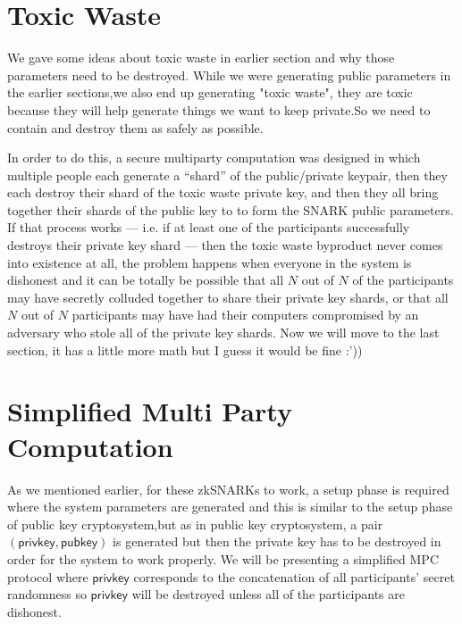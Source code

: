 \documentclass[12pt,letterpaper]{article}
\begin{document}
\section{Toxic Waste}
We gave some ideas about toxic waste in earlier section and why those parameters need to be destroyed. While we were generating public parameters in the earlier sections,we also end up generating "toxic waste", they are toxic because they will help generate things we want to keep private.So we need to contain and destroy them as safely as possible.

In order to do this, a secure multiparty computation was designed in which multiple people each generate a “shard” of the public/private keypair, then they each destroy their shard of the toxic waste private key, and then they all bring together their shards of the public key to to form the SNARK public parameters. If that process works — i.e. if at least one of the participants successfully destroys their private key shard — then the toxic waste byproduct never comes into existence at all, the problem happens when everyone in the system is dishonest and it can be totally be possible  that all $N$ out of $N$ of the participants may have secretly colluded together to share their private key shards, or that all $N$ out of $N$ participants may have had their computers compromised by an adversary who stole all of the private key shards. Now we will move to the last section, it has a little more math but I guess it would be fine :'))

\section{Simplified Multi Party Computation}
As we mentioned earlier, for these zkSNARKs to work, a setup phase is required where the system parameters are generated and this is similar to the setup phase of public key cryptosystem,but as in public key cryptosystem, a pair $(\mathsf{privkey},\mathsf{pubkey})$ is generated but then the private key has to be destroyed in order for the system to work properly.  We will be presenting a simplified MPC protocol where
$\mathsf{privkey}$ corresponds to the concatenation of all participants’ secret randomness so $\mathsf{privkey}$ will be destroyed unless all of the participants are dishonest. 
\end{document}
